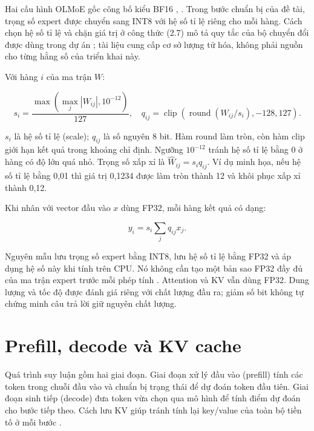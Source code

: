 Hai cấu hình OLMoE gốc công bố kiểu BF16 \cite{olmoe_0924_config}, \cite{olmoe_0125_config}. Trong bước chuẩn bị của đề tài, trọng số expert được chuyển sang INT8 với hệ số tỉ lệ riêng cho mỗi hàng. Cách chọn hệ số tỉ lệ và chặn giá trị ở công thức (2.7) mô tả quy tắc của bộ chuyển đổi được dùng trong dự án \cite{moe_tierengine_arch}; tài liệu \cite{quantization_survey} cung cấp cơ sở lượng tử hóa, không phải nguồn cho từng hằng số của triển khai này.

Với hàng $i$ của ma trận $W$:

\begin{equation}
\label{eq:2.7}
s_i=\frac{\max(\max_j|W_{ij}|,10^{-12})}{127},\quad q_{ij}=\operatorname{clip}\left(\operatorname{round}(W_{ij}/s_i),-128,127\right).
\end{equation}

$s_i$ là hệ số tỉ lệ (scale); $q_{ij}$ là số nguyên 8 bit. Hàm round làm tròn, còn hàm clip giới hạn kết quả trong khoảng chỉ định. Ngưỡng $10^{-12}$ tránh hệ số tỉ lệ bằng 0 ở hàng có độ lớn quá nhỏ. Trọng số xấp xỉ là $\widehat W_{ij}=s_iq_{ij}$. Ví dụ minh họa, nếu hệ số tỉ lệ bằng 0,01 thì giá trị 0,1234 được làm tròn thành 12 và khôi phục xấp xỉ thành 0,12.

Khi nhân với vector đầu vào $x$ dùng FP32, mỗi hàng kết quả có dạng:

\begin{equation}
\label{eq:2.8}
y_i=s_i\sum_jq_{ij}x_j.
\end{equation}

Nguyên mẫu lưu trọng số expert bằng INT8, lưu hệ số tỉ lệ bằng FP32 và áp dụng hệ số này khi tính trên CPU. Nó không cần tạo một bản sao FP32 đầy đủ của ma trận expert trước mỗi phép tính \cite{moe_tierengine_arch}. Attention và KV vẫn dùng FP32. Dung lượng và tốc độ được đánh giá riêng với chất lượng đầu ra; giảm số bit không tự chứng minh câu trả lời giữ nguyên chất lượng.

\section{Prefill, decode và KV cache}

Quá trình suy luận gồm hai giai đoạn. Giai đoạn xử lý đầu vào (prefill) tính các token trong chuỗi đầu vào và chuẩn bị trạng thái để dự đoán token đầu tiên. Giai đoạn sinh tiếp (decode) đưa token vừa chọn qua mô hình để tính điểm dự đoán cho bước tiếp theo. Cách lưu KV giúp tránh tính lại key/value của toàn bộ tiền tố ở mỗi bước \cite{hf_kv_cache}.

